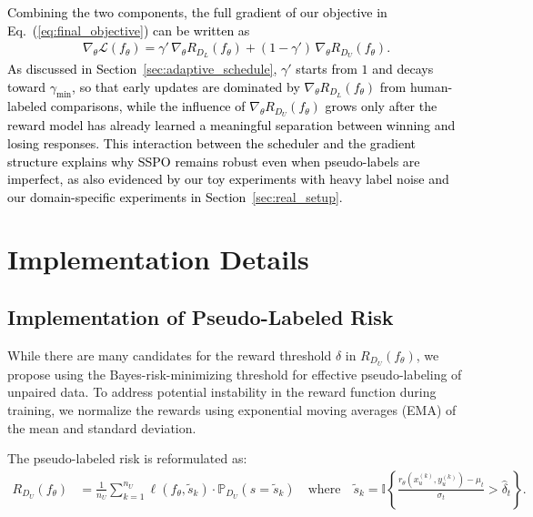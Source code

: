 \documentclass{article} %
\newcommand\rebuttal[1]{\textcolor{black}{#1}}
\begin{document}
\rebuttal{Combining the two components, the full gradient of our objective in Eq.~(\ref{eq:final_objective}) can be written as
\begin{align*}
    \nabla_\theta \mathcal{L}(f_\theta)
    = \gamma'\,\nabla_\theta R_{D_L}(f_\theta)
    + (1-\gamma')\,\nabla_\theta R_{D_U}(f_\theta).
\end{align*}
As discussed in Section~\ref{sec:adaptive_schedule}, $\gamma'$ starts from $1$ and decays toward $\gamma_{\min}$, so that early updates are dominated by $\nabla_\theta R_{D_L}(f_\theta)$ from human-labeled comparisons, while the influence of $\nabla_\theta R_{D_U}(f_\theta)$ grows only after the reward model has already learned a meaningful separation between winning and losing responses. This interaction between the scheduler and the gradient structure explains why SSPO remains robust even when pseudo-labels are imperfect, as also evidenced by our toy experiments with heavy label noise and our domain-specific experiments in Section~\ref{sec:real_setup}.}

\section{Implementation Details}

\subsection{Implementation of Pseudo-Labeled Risk}
\label{appendix:implementation-pseudo-labeled-risk}

While there are many candidates for the reward threshold $\hat{\delta}$ in $R_{D_U}(f_\theta)$, we propose using the Bayes-risk-minimizing threshold for effective pseudo-labeling of unpaired data. To address potential instability in the reward function during training, we normalize the rewards using exponential moving averages (EMA) of the mean and standard deviation.

The pseudo-labeled risk is reformulated as:
\begin{align*}
   R_{D_U}(f_\theta) &= \frac{1}{n_U} \sum_{k=1}^{n_U} \ell(f_\theta, \tilde{s}_k) \cdot \mathbb{P}_{D_U}(s = \tilde{s}_k) \label{eq:pseudo_risk}
   \quad \text{where}\quad \tilde{s}_k = \mathbb{I}\left\{ \frac{r_\theta(x_u^{(k)}, y_u^{(k)}) - \mu_t}{\sigma_t} > \hat{\delta}_t \right\}. \nonumber
\end{align*}
\end{document}
